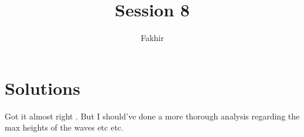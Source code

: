 \documentclass[]{article}
\title{Session 8}
\author{Fakhir}
\begin{document}
\maketitle

\section*{Solutions}

Got it almost right \checkmark. But I should've done a more thorough analysis regarding the max heights of the waves etc etc. 
\end{document}
